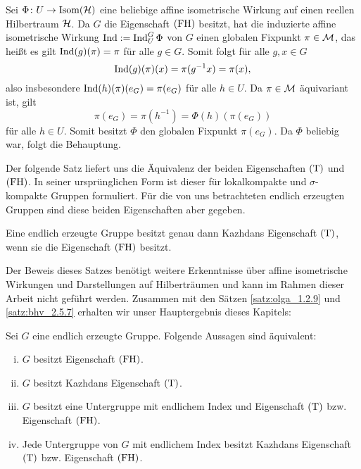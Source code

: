 \begin{beweis}
	Sei $\Phi\colon U \rightarrow \operatorname{Isom}(\mathcal{H})$ eine beliebige affine isometrische Wirkung auf einen reellen Hilbertraum $\mathcal{H}$. Da $G$ die Eigenschaft $\operatorname{(FH)}$ besitzt, hat die induzierte affine isometrische Wirkung $\operatorname{Ind} := \operatorname{Ind}_U^G\Phi$ von $G$ einen globalen Fixpunkt $\pi \in \mathcal{M}$, das heißt es gilt $\operatorname{Ind}(g)(\pi) = \pi$ für alle $g \in G$. Somit folgt für alle $g,x \in G$
	\[
		\operatorname{Ind}(g)(\pi)(x) = \pi(g^{-1}x) = \pi(x),
	\]
	also insbesondere $\operatorname{Ind}(h)(\pi)(e_G) = \pi(e_G)$ für alle $h \in U$. Da $\pi \in \mathcal{M}$ äquivariant ist, gilt
	\[
		\pi(e_G) = \pi(h^{-1}) = \Phi(h)(\pi(e_G))
	\]
	für alle $h \in U$. Somit besitzt $\Phi$ den globalen Fixpunkt $\pi(e_G)$. Da $\Phi$ beliebig war, folgt die Behauptung.
\end{beweis}

Der folgende Satz liefert uns die Äquivalenz der beiden Eigenschaften $\operatorname{(T)}$ und $\operatorname{(FH)}$. In seiner ursprünglichen Form ist dieser für lokalkompakte und $\sigma$-kompakte Gruppen formuliert. Für die von uns betrachteten endlich erzeugten Gruppen sind diese beiden Eigenschaften aber gegeben.

\begin{satz}
\label{satz:delorme-guichardet}
	Eine endlich erzeugte Gruppe besitzt genau dann Kazhdans Eigenschaft $\operatorname{(T)}$, wenn sie die Eigenschaft $\operatorname{(FH)}$ besitzt.
\end{satz}

Der Beweis dieses Satzes benötigt weitere Erkenntnisse über affine isometrische Wirkungen und Darstellungen auf Hilberträumen und kann im Rahmen dieser Arbeit nicht geführt werden. Zusammen mit den Sätzen \ref{satz:olga_1.2.9} und \ref{satz:bhv_2.5.7} erhalten wir unser Hauptergebnis dieses Kapitels:
\newpage
\begin{theo}
\label{thm:kap2}
	Sei $G$ eine endlich erzeugte Gruppe. Folgende Aussagen sind äquivalent:
	\begin{enumerate}[(i)]
		\item $G$ besitzt Eigenschaft $\operatorname{(FH)}$.
		\item $G$ besitzt Kazhdans Eigenschaft $\operatorname{(T)}$.
		\item $G$ besitzt eine Untergruppe mit endlichem Index und Eigenschaft $\operatorname{(T)}$ bzw. Eigenschaft $\operatorname{(FH)}$.
		\item Jede Untergruppe von $G$ mit endlichem Index besitzt Kazhdans Eigenschaft $\operatorname{(T)}$ bzw. Eigenschaft $\operatorname{(FH)}$.
	\end{enumerate}
\end{theo}

\cleardoubleoddemptypage